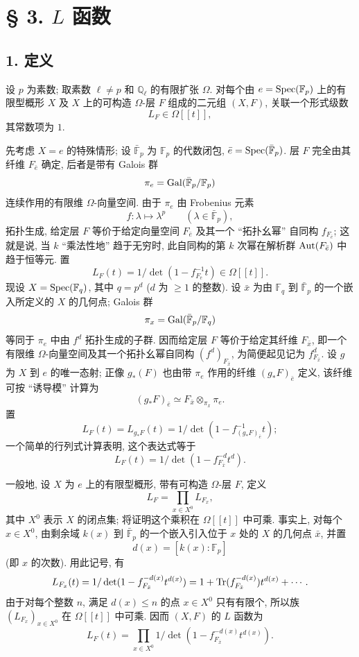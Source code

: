 \section*{§ 3. $L$ 函数}

\subsection*{1. 定义}

设 $p$ 为素数; 取素数 $\ell\ne p$ 和 $\mathbb Q_\ell$ 的有限扩张 $\Omega$. 对每个由 $e=\operatorname{Spec}(\mathbb F_p)$ 上的有限型概形 $X$ 及 $X$ 上的可构造 $\Omega$-层 $F$ 组成的二元组 $(X,F)$, 关联一个形式级数
\[
L_F\in\Omega[[t]],
\]
其常数项为 $1$.


先考虑 $X=e$ 的特殊情形; 设 $\bar{\mathbb F}_p$ 为 $\mathbb F_p$ 的代数闭包, $\bar e=\operatorname{Spec}(\bar{\mathbb F}_p)$. 层 $F$ 完全由其纤维 $F_{\bar e}$ 确定, 后者是带有 Galois 群
\[
\pi_e=\operatorname{Gal}(\bar{\mathbb F}_p/\mathbb F_p)
\]
连续作用的有限维 $\Omega$-向量空间. 由于 $\pi_e$ 由 Frobenius 元素
\[
f:\lambda\longmapsto\lambda^p\qquad(\lambda\in\bar{\mathbb F}_p),
\]
拓扑生成, 给定层 $F$ 等价于给定向量空间 $F_{\bar e}$ 及其一个 ``拓扑幺幂'' 自同构 $f_{F_{\bar e}}$; 这就是说, 当 $k$ ``乘法性地'' 趋于无穷时, 此自同构的第 $k$ 次幂在解析群 $\operatorname{Aut}(F_{\bar e})$ 中趋于恒等元. 置
\[
L_F(t)=1/\det(1-f_{F_{\bar e}}^{-1}t)\in\Omega[[t]].
\]
现设 $X=\operatorname{Spec}(\mathbb F_q)$, 其中 $q=p^d$ ($d$ 为 $\ge1$ 的整数). 设 $\bar x$ 为由 $\mathbb F_q$ 到 $\bar{\mathbb F}_p$ 的一个嵌入所定义的 $X$ 的几何点; Galois 群
\[
\pi_x=\operatorname{Gal}(\bar{\mathbb F}_p/\mathbb F_q)
\]
等同于 $\pi_e$ 中由 $f^d$ 拓扑生成的子群. 因而给定层 $F$ 等价于给定其纤维 $F_{\bar x}$, 即一个有限维 $\Omega$-向量空间及其一个拓扑幺幂自同构 $(f^d)_{F_{\bar x}}$, 为简便起见记为 $f^d_{F_{\bar x}}$. 设 $g$ 为 $X$ 到 $e$ 的唯一态射; 正像 $g_*(F)$ 也由带 $\pi_e$ 作用的纤维 $(g_*F)_{\bar e}$ 定义, 该纤维可按 ``诱导模'' 计算为
\[
(g_*F)_{\bar e}\simeq F_{\bar x}\otimes_{\pi_x}\pi_e.
\]
置
\[
L_F(t)=L_{g_*F}(t)=1/\det(1-f^{-1}_{(g_*F)_{\bar e}}t);
\]
一个简单的行列式计算表明, 这个表达式等于
\[
L_F(t)=1/\det(1-f^{-d}_{F_{\bar x}}t^d).
\]

一般地, 设 $X$ 为 $e$ 上的有限型概形, 带有可构造 $\Omega$-层 $F$, 定义
\[
L_F=\prod_{x\in X^0}L_{F_x},
\]
其中 $X^0$ 表示 $X$ 的闭点集; 将证明这个乘积在 $\Omega[[t]]$ 中可乘. 事实上, 对每个 $x\in X^0$, 由剩余域 $k(x)$ 到 $\bar{\mathbb F}_p$ 的一个嵌入引入位于 $x$ 处的 $X$ 的几何点 $\bar x$, 并置
\[
d(x)=[k(x):\mathbb F_p]
\]
(即 $x$ 的次数). 用此记号, 有
\[
L_{F_x}(t)=1/\det(1-f_{F_{\bar x}}^{-d(x)}t^{d(x)})
 =1+\operatorname{Tr}(f_{F_{\bar x}}^{-d(x)})t^{d(x)}+\cdots .
\]
由于对每个整数 $n$, 满足 $d(x)\le n$ 的点 $x\in X^0$ 只有有限个, 所以族 $(L_{F_x})_{x\in X^0}$ 在 $\Omega[[t]]$ 中可乘. 因而 $(X,F)$ 的 $L$ 函数为
\[
L_F(t)=\prod_{x\in X^0}1/\det(1-f_{F_{\bar x}}^{-d(x)}t^{d(x)}).
\]

